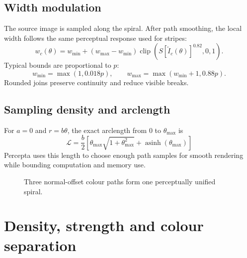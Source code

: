 \documentclass[10.5pt,a4paper]{article}
\newcommand{\clip}{\operatorname{clip}}
\begin{document}
\subsection{Width modulation}
The source image is sampled along the spiral. After path smoothing, the local width follows the same perceptual response used for stripes:
\begin{equation}
w_c(\theta)=w_{\min}+(w_{\max}-w_{\min})
\clip\!\left(S[\widetilde I_c(\theta)]^{0.82},0,1\right).
\end{equation}
Typical bounds are proportional to $p$:
\begin{equation}
w_{\min}=\max(1,0.018p),
\qquad
w_{\max}=\max(w_{\min}+1,0.88p).
\end{equation}
Rounded joins preserve continuity and reduce visible breaks.

\subsection{Sampling density and arclength}
For $a=0$ and $r=b\theta$, the exact arclength from $0$ to $\theta_{\max}$ is
\begin{equation}
\boxed{
\mathcal{L}=\frac{b}{2}\left[
\theta_{\max}\sqrt{1+\theta_{\max}^{2}}
+\operatorname{asinh}(\theta_{\max})
\right]
}
\end{equation}
Percepta uses this length to choose enough path samples for smooth rendering while bounding computation and memory use.

\begin{figure}[H]
\centering
{}
\caption{Three normal-offset colour paths form one perceptually unified spiral.}
\end{figure}

\section{Density, strength and colour separation}
\end{document}
